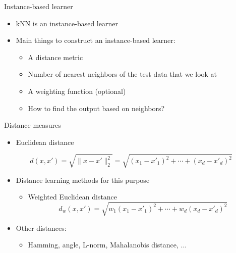 \documentclass[serif, aspectratio=169]{beamer}
\begin{document}
\begin{frame}{Instance-based learner}
    \begin{itemize}
        \item kNN is an instance-based learner
        \item Main things to construct an instance-based learner:
        \begin{itemize}
            \item A distance metric
            \item Number of nearest neighbors of the test data that we look at
            \item A weighting function (optional)
            \item How to find the output based on neighbors?
        \end{itemize}
    \end{itemize}
\end{frame}

\begin{frame}{Distance measures}
    \begin{itemize}
        \item Euclidean distance
    \end{itemize}
       \[
          d(x, x') = \sqrt{\|x - x'\|_2^2} = \sqrt{(x_1 - x'_1)^2 + \cdots + (x_d - x'_d)^2}
       \]
    \begin{itemize}
        \item Distance learning methods for this purpose
        \begin{itemize}
            \item Weighted Euclidean distance
             \[
                d_w(x, x') = \sqrt{w_1(x_1 - x'_1)^2 + \cdots + w_d(x_d - x'_d)^2}
             \]
        \end{itemize}
    \item Other distances:
        \begin{itemize}
            \item Hamming, angle, L-norm, Mahalanobis distance, ...
        \end{itemize}
    \end{itemize}       
\end{frame}
\end{document}

